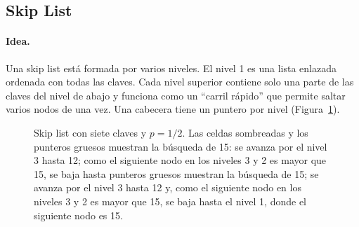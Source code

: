 \documentclass[11pt,a4paper]{article}
\begin{document}
\subsection{Skip List}

\paragraph{Idea.}
Una skip list está formada por varios niveles. El nivel 1 es una lista enlazada
ordenada con todas las claves. Cada nivel superior contiene solo una parte de
las claves del nivel de abajo y funciona como un ``carril rápido'' que permite
saltar varios nodos de una vez. Una cabecera tiene un puntero por nivel
(Figura~\ref{fig:skiplist}).

\begin{figure}[!htb]
\centering
{}
\caption{Skip list con siete claves y $p = 1/2$. Las celdas sombreadas y los
punteros gruesos muestran la búsqueda de 15: se avanza por el nivel 3 hasta
12; como el siguiente nodo en los niveles 3 y 2 es mayor que 15, se baja hasta
punteros gruesos muestran la búsqueda de 15; se avanza por el nivel 3 hasta
12 y, como el siguiente nodo en los niveles 3 y 2 es mayor que 15, se baja hasta
el nivel 1, donde el siguiente nodo es 15.}
\label{fig:skiplist}
\end{figure}
\end{document}
